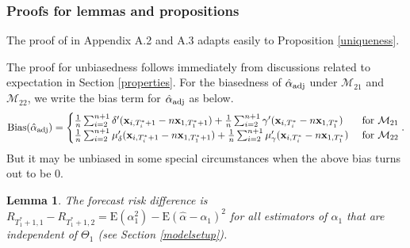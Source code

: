 \documentclass[11pt]{article}
\def\mbf#1{\mathbf{#1}} %
\def\mrm#1{\mathrm{#1}} %
\def\mc#1{\mathcal{#1}} %
\def\E#1{\mathrm{E}(#1)} %
\newtheorem{lem}{Lemma}
\theoremstyle{definition}
\newenvironment{proof-of-proposition}[1][{}]{\noindent{\bf
    Proof of Proposition {#1}}
  \hspace*{.5em}}{\qed\bigskip\\}
\begin{document}
\subsubsection{Proofs for lemmas and propositions}

\begin{proof-of-proposition}[\ref{uniqueness}]
  The proof of \citet{li2019statistical} in Appendix A.2 and A.3 adapts easily to Proposition \ref{uniqueness}.
\end{proof-of-proposition}


\begin{proof-of-proposition}[\ref{unbiased}] The proof for unbiasedness follows immediately from discussions related to expectation in Section \ref{properties}. For the biasedness of  $\hat{\alpha}_{\rm adj}$ under $\mc{M}_{21}$ and $\mc{M}_{22}$, we write the bias term for $\hat{\alpha}_{\rm adj}$ as below.
\begin{align*}
  \mrm{Bias}(\hat{\alpha}_{\rm adj}) = 
  \begin{cases}
       \frac{1}{n} \sum_{i=2}^{n+1} \delta'(\mbf{x}_{i, T_i^*+1}-n\mbf{x}_{1, T_1^*+1}) +  \frac{1}{n} \sum_{i=2}^{n+1} \gamma'(\mbf{x}_{i, T_i^*}-n\mbf{x}_{1, T_1^*}) & \text{ for } \mc{M}_{21}\\
    \frac{1}{n} \sum_{i=2}^{n+1} \mu_{\delta}'(\mbf{x}_{i, T_i^*+1}-n\mbf{x}_{1, T_1^*+1}) +  \frac{1}{n} \sum_{i=2}^{n+1} \mu_{\gamma}'(\mbf{x}_{i, T_i^*}-n\mbf{x}_{1, T_1^*}) & \text{ for }\mc{M}_{22}
  \end{cases}.
\end{align*}
But it may be unbiased in some special circumstances when the above bias turns out to be 0. \end{proof-of-proposition}

\begin{lem}
  \label{risklemma} The forecast risk difference is $R_{T_1^*+1,1}-R_{T_1^*+1,2}=\E{\alpha_1^2}-\E{\hat{\alpha}-\alpha_1}^2$ for all estimators of $\alpha_1$ that are independent of $\Theta_1$ (see Section \ref{modelsetup}).
\end{lem}
\end{document}

